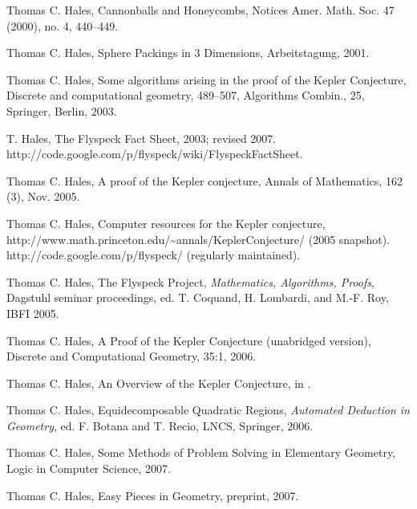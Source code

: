 \begin{thebibliography}{CHMS94}

 Thomas C. Hales, Cannonballs and Honeycombs,
Notices Amer. Math. Soc.  47  (2000),  no. 4, 440--449.

 Thomas C. Hales, Sphere Packings in 3
Dimensions, Arbeitstagung, 2001.

 Thomas C. Hales, Some algorithms arising in
the proof of the Kepler Conjecture, Discrete and computational
geometry, 489--507, Algorithms Combin., 25, Springer, Berlin,
2003.

   T. Hales, The Flyspeck Fact Sheet, 2003; revised
2007. http://code.google.com/p/flyspeck/wiki/FlyspeckFactSheet.


 Thomas C. Hales, A proof of the
Kepler conjecture, Annals of Mathematics, 162 (3), Nov. 2005.

 Thomas C. Hales, Computer resources for the Kepler conjecture, \hfill\break
    http://www.math.princeton.edu/\~\!annals/KeplerConjecture/ (2005 snapshot).
    http://code.google.com/p/flyspeck/ (regularly maintained).

  Thomas C. Hales, The Flyspeck Project, 
{\it Mathematics, Algorithms, Proofs}, Dagstuhl seminar proceedings, 
ed. T. Coquand, H. Lombardi, and M.-F. Roy,
IBFI 2005.

 Thomas C. Hales, A Proof of the
Kepler Conjecture (unabridged version), 
Discrete and Computational Geometry, 35:1, 2006.

 Thomas C. Hales, An
Overview of the Kepler Conjecture, in \cite{DCG}.

 Thomas C. Hales, Equidecomposable Quadratic Regions,
{\it Automated Deduction in Geometry}, ed. F. Botana and T. Recio,
LNCS, Springer, 2006.

 Thomas C. Hales,  Some Methods of Problem
Solving in Elementary Geometry, Logic in Computer Science, 2007.

 Thomas C. Hales, Easy Pieces in Geometry, preprint, 2007.


\end{thebibliography}
